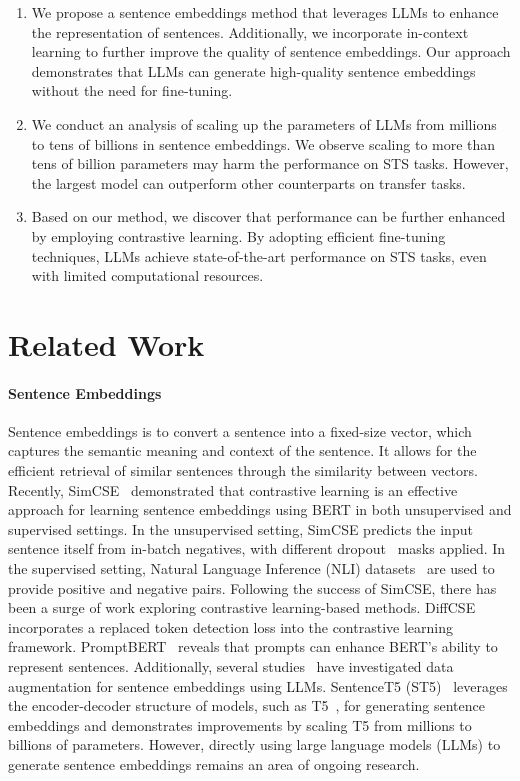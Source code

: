 \documentclass{article}
\begin{document}
\begin{enumerate}
\item We propose a sentence embeddings method that leverages LLMs to enhance the representation of sentences. Additionally, we incorporate in-context learning to further improve the quality of sentence embeddings. Our approach demonstrates that LLMs can generate high-quality sentence embeddings without the need for fine-tuning.
\item We conduct an analysis of scaling up the parameters of LLMs from millions to tens of billions in sentence embeddings. We observe scaling to more than tens of billion parameters may harm the performance on STS tasks. However, the largest model can outperform other counterparts on transfer tasks.
\item Based on our method, we discover that performance can be further enhanced by employing contrastive learning. By adopting efficient fine-tuning techniques, LLMs achieve state-of-the-art performance on STS tasks, even with limited computational resources.
\end{enumerate}

\section{Related Work}

\paragraph{Sentence Embeddings}
Sentence embeddings is to convert a sentence into a fixed-size vector, which captures the semantic meaning and context of the sentence.
It allows for the efficient retrieval of similar sentences through the similarity between vectors.
Recently, SimCSE~\cite{gao2021simcse} demonstrated that contrastive learning is an effective approach for learning sentence embeddings using BERT in both unsupervised and supervised settings. In the unsupervised setting, SimCSE predicts the input sentence itself from in-batch negatives, with different dropout~\cite{srivastava2014dropout} masks applied.
In the supervised setting, Natural Language Inference (NLI) datasets~\cite{conneau-etal-2017-supervised-infersent, reimers2019sentence} are used to provide positive and negative pairs.
Following the success of SimCSE, there has been a surge of work exploring contrastive learning-based methods. DiffCSE~\cite{chuang2022diffcse} incorporates a replaced token detection loss into the contrastive learning framework. PromptBERT~\cite{jiang2022promptbert} reveals that prompts can enhance BERT's ability to represent sentences.
Additionally, several studies~\cite{cheng2023improving, zhang2023contrastive} have investigated data augmentation for sentence embeddings using LLMs.
SentenceT5 (ST5)~\cite{sentencet5} leverages the encoder-decoder structure of models, such as T5~\cite{raffel2020exploring}, for generating sentence embeddings and demonstrates improvements by scaling T5 from millions to billions of parameters. However, directly using large language models (LLMs) to generate sentence embeddings remains an area of ongoing research.
\end{document}
